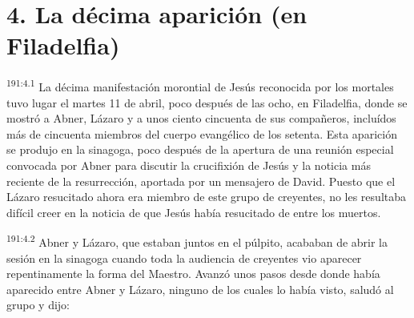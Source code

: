 \section*{4. La décima aparición (en Filadelfia)}
\par
\textsuperscript{191:4.1} La décima manifestación morontial de Jesús reconocida por los mortales tuvo lugar el martes 11 de abril, poco después de las ocho, en Filadelfia, donde se mostró a Abner, Lázaro y a unos ciento cincuenta de sus compañeros, incluídos más de cincuenta miembros del cuerpo evangélico de los setenta. Esta aparición se produjo en la sinagoga, poco después de la apertura de una reunión especial convocada por Abner para discutir la crucifixión de Jesús y la noticia más reciente de la resurrección, aportada por un mensajero de David. Puesto que el Lázaro resucitado ahora era miembro de este grupo de creyentes, no les resultaba difícil creer en la noticia de que Jesús había resucitado de entre los muertos.

\par
\textsuperscript{191:4.2} Abner y Lázaro, que estaban juntos en el púlpito, acababan de abrir la sesión en la sinagoga cuando toda la audiencia de creyentes vio aparecer repentinamente la forma del Maestro. Avanzó unos pasos desde donde había aparecido entre Abner y Lázaro, ninguno de los cuales lo había visto, saludó al grupo y dijo:

